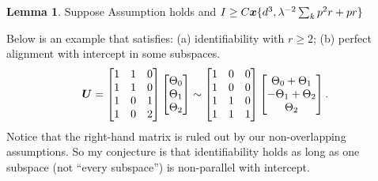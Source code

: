 \documentclass[10pt]{article}
\newcommand*{\KeepStyleUnderBrace}[1]{%
  \mathop{%
    \mathchoice
    {\underbrace{\displaystyle#1}}%
    {\underbrace{\textstyle#1}}%
    {\underbrace{\scriptstyle#1}}%
    {\underbrace{\scriptscriptstyle#1}}%
  }\limits
}
\theoremstyle{definition}
\newtheorem{lem}{Lemma}
\theoremstyle{definition}
\theoremstyle{definition}
\begin{document}
\begin{lem}
Suppose Assumption holds and $I\geq C \bm x\{d^3, \lambda^{-2}\sum_k p^2r+pr\}$
\end{lem}
Below is an example that satisfies: (a) identifiability with $r\geq 2$; (b) perfect alignment with intercept in some subspaces. 
\[
\bm{U}=\begin{bmatrix}
1 & 1 & 0\\
1 & 1 & 0\\
1 & 0 & 1\\
1 & 0 & 2\\
\end{bmatrix}
\begin{bmatrix}
\Theta_0\\
\Theta_1\\
\Theta_2\\
\end{bmatrix}
\sim 
\begin{bmatrix}
1 & 0 & 0\\
1 & 0 & 0\\
1 & 1 & 0\\
1 & 1 & 1\\
\end{bmatrix}
\begin{bmatrix}
\Theta_0+\Theta_1\\
-\Theta_1+\Theta_2\\
\Theta_2\\
\end{bmatrix}.
\]
Notice that the right-hand matrix is ruled out by our non-overlapping assumptions. So my conjecture is that identifiability holds as long as one subspace (not ``every subspace'') is non-parallel with intercept. 
\end{document}
